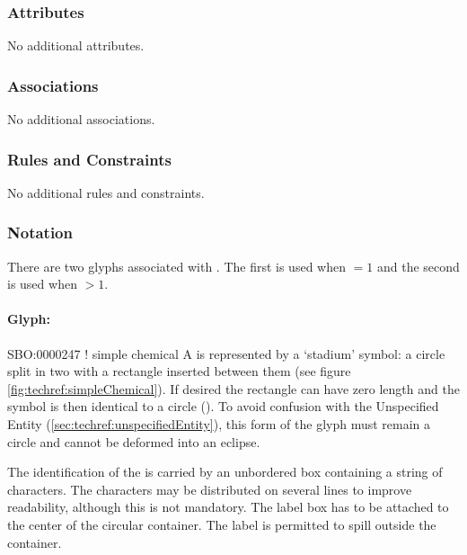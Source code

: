 \subsubsection{Attributes}

No additional attributes.

\subsubsection{Associations}

No additional associations.

\subsubsection{Rules and Constraints}

No additional rules and constraints.

\subsubsection{Notation}

There are two glyphs associated with . The
first  is used when  $= 1$
and the second  is used when
 $> 1$.

\paragraph{Glyph: }

\begin{glyphDescription}
  \glyphSboTerm SBO:0000247 ! simple chemical \glyphContainer A
   is represented by a `stadium' symbol: a
  circle split in two with a rectangle inserted between them (see
  figure \ref{fig:techref:simpleChemical}). If desired the rectangle can have
  zero length and the symbol is then identical to a circle
  (). To avoid confusion with the Unspecified
  Entity (\ref{sec:techref:unspecifiedEntity}), this form of the glyph must remain a
  circle and cannot be deformed into an eclipse.

  \glyphLabel The identification of the  is
  carried by an unbordered box containing a string of characters.  The
  characters may be distributed on several lines to improve
  readability, although this is not mandatory.  The label box has to
  be attached to the center of the circular container.  The label is
  permitted to spill outside the container.
\end{glyphDescription}

